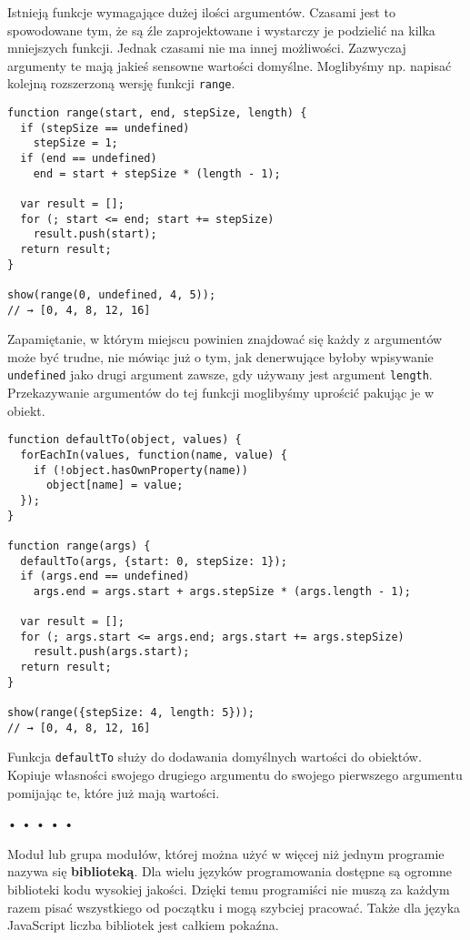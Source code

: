   
Istnieją funkcje wymagające dużej ilości argumentów. Czasami jest to spowodowane tym, że są źle zaprojektowane i wystarczy je podzielić na kilka mniejszych funkcji. Jednak czasami nie ma innej możliwości. Zazwyczaj argumenty te mają jakieś sensowne wartości domyślne. Moglibyśmy np. napisać kolejną rozszerzoną wersję funkcji \texttt{range}.

  
\begin{verbatim} 
function range(start, end, stepSize, length) {
  if (stepSize == undefined)
    stepSize = 1;
  if (end == undefined)
    end = start + stepSize * (length - 1);

  var result = [];
  for (; start <= end; start += stepSize)
    result.push(start);
  return result;
}

show(range(0, undefined, 4, 5));
// → [0, 4, 8, 12, 16]
\end{verbatim}
  
Zapamiętanie, w którym miejscu powinien znajdować się każdy z argumentów może być trudne, nie mówiąc już o tym, jak denerwujące byłoby wpisywanie \texttt{undefined} jako drugi argument zawsze, gdy używany jest argument \texttt{length}. Przekazywanie argumentów do tej funkcji moglibyśmy uprościć pakując je w obiekt.

  
\begin{verbatim} 
function defaultTo(object, values) {
  forEachIn(values, function(name, value) {
    if (!object.hasOwnProperty(name))
      object[name] = value;
  });
}

function range(args) {
  defaultTo(args, {start: 0, stepSize: 1});
  if (args.end == undefined)
    args.end = args.start + args.stepSize * (args.length - 1);

  var result = [];
  for (; args.start <= args.end; args.start += args.stepSize)
    result.push(args.start);
  return result;
}

show(range({stepSize: 4, length: 5}));
// → [0, 4, 8, 12, 16]
\end{verbatim}
  
Funkcja \texttt{defaultTo} służy do dodawania domyślnych wartości do obiektów. Kopiuje własności swojego drugiego argumentu do swojego pierwszego argumentu pomijając te, które już mają wartości.



\begin{center}
• • • • •
\end{center}

  
Moduł lub grupa modułów, której można użyć w więcej niż jednym programie nazywa się \textbf{biblioteką}. Dla wielu języków programowania dostępne są ogromne biblioteki kodu wysokiej jakości. Dzięki temu programiści nie muszą za każdym razem pisać wszystkiego od początku i mogą szybciej pracować. Także dla języka JavaScript liczba bibliotek jest całkiem pokaźna.

